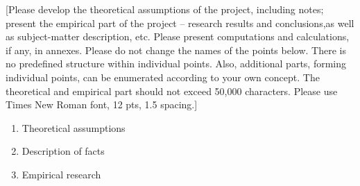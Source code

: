 [Please develop the theoretical assumptions of the project, including notes;
present the empirical part of the project -- research results and conclusions,as well as subject-matter description, etc.
Please present computations and calculations, if any, in annexes.
Please do not change the names of the points below.
There is no predefined structure within individual points.
Also, additional parts, forming individual points, can be enumerated according to your own concept.
The theoretical and empirical part should not exceed 50,000 characters.
Please use Times New Roman font, 12 pts, 1.5 spacing.]
\begin{enumerate}
    \item Theoretical assumptions
    \item Description of facts
    \item Empirical research
\end{enumerate}